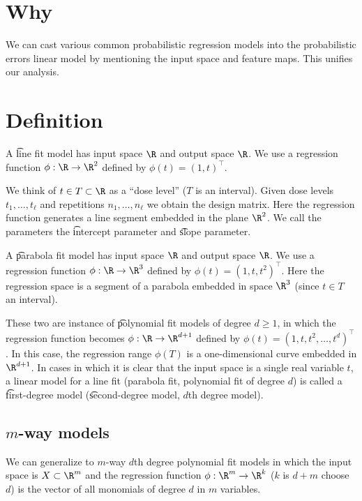 
\section*{Why}

We can cast various common probabilistic regression models into the probabilistic errors linear model by mentioning the input space and feature maps.
This unifies our analysis.

\section*{Definition}


A \t{line fit model} has input space $\R $ and output space $\R $.
We use a regression function $\phi : \R  \to \R ^2$ defined by $\phi (t) = (1, t)^\top $.

We think of $t \in T \subset \R $ as a ``dose level'' ($T$ is an interval).
Given dose levels $t_1, \dots , t_\ell $ and repetitions $n_1, \dots , n_\ell $ we obtain the design matrix.
Here the regression function generates a line segment embedded in the plane $\R ^2$.
We call the parameters the \t{intercept parameter} and \t{slope parameter}.

A \t{parabola fit model} has input space $\R $ and output space $\R $.
We use a regression function $\phi : \R  \to \R ^3$ defined by $\phi (t) = (1, t, t^2)^\top $.
Here the regression space is a segment of a parabola embedded in space $\R ^3$ (since $t \in T$ an interval).

These two are instance of \t{polynomial fit models} of degree $d \geq 1$, in which the regression function becomes $\phi : \R \to \R ^{d + 1}$ defined by $\phi (t) = (1, t, t^2, \dots , t^d)^\top $.
In this case, the regression range $\phi (T)$ is a one-dimensional curve embedded in $\R ^{d+1}$.
In cases in which it is clear that the input space is a single real variable $t$, a linear model for a line fit (parabola fit, polynomial fit of degree $d$) is called a \t{first-degree model} (\t{second-degree model}, \t{$d$th degree model}).

\subsection*{$m$-way models}

We can generalize to \t{$m$-way $d$th degree polynomial fit models} in which the input space is $X \subset \R ^m$ and the regression function $\phi : \R ^m \to \R ^k$ ($k$ is $d+m$ choose $d$) is the vector of all monomials of degree $d$ in $m$ variables.

